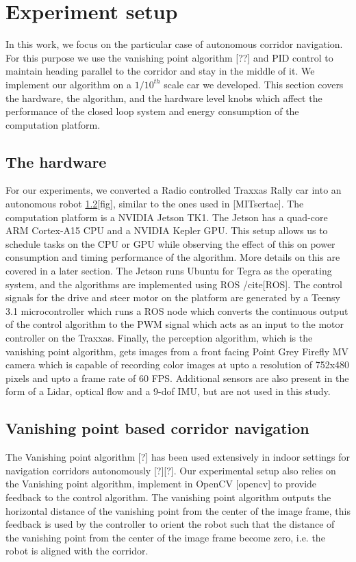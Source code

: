 \section{Experiment setup}

In this work, we focus on the particular case of autonomous corridor navigation. For this purpose we use the vanishing point algorithm [??] and PID control to maintain heading parallel to the corridor and stay in the middle of it. We implement our algorithm on a $1/10^{th}$ scale car we developed. This section covers the hardware, the algorithm, and the hardware level knobs which affect the performance of the closed loop system and energy consumption of the computation platform.

\subsection{The hardware}

For our experiments, we converted a Radio controlled Traxxas Rally car into an autonomous robot \ref{}[fig], similar to the ones used in \cite{}[MITsertac]. The computation platform is a NVIDIA Jetson TK1. The Jetson has a quad-core ARM Cortex-A15 CPU and a NVIDIA Kepler GPU. This setup allows us to schedule tasks on the CPU or GPU while observing the effect of this on power consumption and timing performance of the algorithm. More details on this are covered in a later section. The Jetson runs Ubuntu for Tegra as the operating system, and the algorithms are implemented using ROS /cite{}[ROS]. The control signals for the drive and steer motor on the platform are generated by a Teensy 3.1 microcontroller which runs a ROS node which converts the continuous output of the control algorithm to the PWM signal which acts as an input to the motor controller on the Traxxas. Finally, the perception algorithm, which is the vanishing point algorithm, gets images from a front facing Point Grey Firefly MV camera which is capable of recording color images at upto a resolution of 752x480 pixels and upto a frame rate of 60 FPS. Additional sensors are also present in the form of a Lidar, optical flow and a 9-dof IMU, but are not used in this study.

\subsection{Vanishing point based corridor navigation}

The Vanishing point algorithm \cite{}[?] has been used extensively in indoor settings for navigation corridors autonomously \cite{}[?][?]. Our experimental setup also relies on the Vanishing point algorithm, implement in OpenCV \cite{}[opencv] to provide feedback to the control algorithm. The vanishing point algorithm outputs the horizontal distance of the vanishing point from the center of the image frame, this feedback is used by the controller to orient the robot such that the distance of the vanishing point from the center of the image frame become zero, i.e. the robot is aligned with the corridor. 

